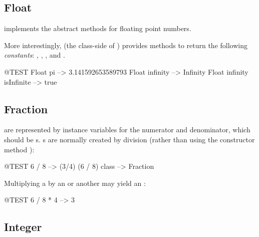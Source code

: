 \documentclass[a4paper,10pt,twoside]{book}
\begin{document}

\subsection{Float}

 implements the abstract  methods for floating point numbers.

More interestingly,  (\ie the class-side of ) provides methods to return the following \emph{constants}: , , , and .

\begin{code}{@TEST}
Float pi                      --> 3.141592653589793
Float infinity               --> Infinity
Float infinity isInfinite --> true
\end{code}

\subsection{Fraction}

 are represented by instance variables for the numerator and denominator, which should be s.
s are normally created by  division (rather than using the constructor method ):

\begin{code}{@TEST}
6 / 8             --> (3/4)
(6 / 8) class --> Fraction
\end{code}

Multiplying a  by an  or another  may yield an :

\begin{code}{@TEST}
6 / 8 * 4 --> 3
\end{code}


\subsection{Integer}
\end{document}
